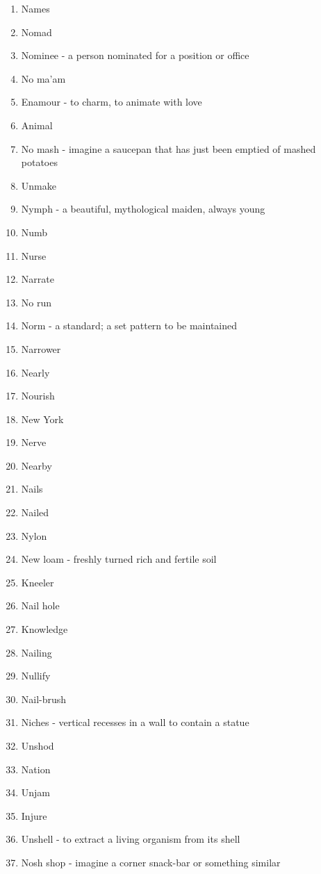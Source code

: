 \begin{enumerate}
        \item Names
        \item Nomad
        \item Nominee - a person nominated for a position or office
        \item No ma'am
        \item Enamour - to charm, to animate with love
        \item Animal
        \item No mash - imagine a saucepan that has just been emptied of mashed potatoes
        \item Unmake
        \item Nymph - a beautiful, mythological maiden, always young
        \item Numb
        \item Nurse
        \item Narrate
        \item No run
        \item Norm - a standard; a set pattern to be maintained
        \item Narrower
        \item Nearly
        \item Nourish
        \item New York
        \item Nerve
        \item Nearby
        \item Nails
        \item Nailed
        \item Nylon
        \item New loam - freshly turned rich and fertile soil
        \item Kneeler
        \item Nail hole
        \item Knowledge
        \item Nailing
        \item Nullify
        \item Nail-brush
        \item Niches - vertical recesses in a wall to contain a statue
        \item Unshod
        \item Nation
        \item Unjam
        \item Injure
        \item Unshell - to extract a living organism from its shell
        \item Nosh shop - imagine a corner snack-bar or something similar

\end{enumerate}
